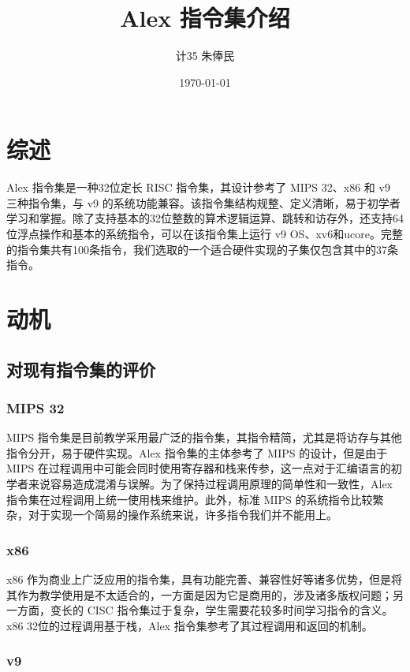 \documentclass[11pt, a4paper]{article}
\title{\hei Alex 指令集介绍}
\author{\kai \quad 计35 \quad 朱俸民 \quad 2012011894}
\date{\kai \today}
\begin{document}
\maketitle

\section{综述}

Alex 指令集是一种32位定长 RISC 指令集，其设计参考了 MIPS 32、x86 和 v9 三种指令集，与 v9 的系统功能兼容。该指令集结构规整、定义清晰，易于初学者学习和掌握。除了支持基本的32位整数的算术逻辑运算、跳转和访存外，还支持64位浮点操作和基本的系统指令，可以在该指令集上运行 v9 OS、xv6和ucore。完整的指令集共有100条指令，我们选取的一个适合硬件实现的子集仅包含其中的37条指令。

\section{动机}

\subsection{对现有指令集的评价}

\subsubsection{MIPS 32}

MIPS 指令集是目前教学采用最广泛的指令集，其指令精简，尤其是将访存与其他指令分开，易于硬件实现。Alex 指令集的主体参考了 MIPS 的设计，但是由于 MIPS 在过程调用中可能会同时使用寄存器和栈来传参，这一点对于汇编语言的初学者来说容易造成混淆与误解。为了保持过程调用原理的简单性和一致性，Alex 指令集在过程调用上统一使用栈来维护。此外，标准 MIPS 的系统指令比较繁杂，对于实现一个简易的操作系统来说，许多指令我们并不能用上。

\subsubsection{x86}

x86 作为商业上广泛应用的指令集，具有功能完善、兼容性好等诸多优势，但是将其作为教学使用是不太适合的，一方面是因为它是商用的，涉及诸多版权问题；另一方面，变长的 CISC 指令集过于复杂，学生需要花较多时间学习指令的含义。x86 32位的过程调用基于栈，Alex 指令集参考了其过程调用和返回的机制。

\subsubsection{v9}
\end{document}
